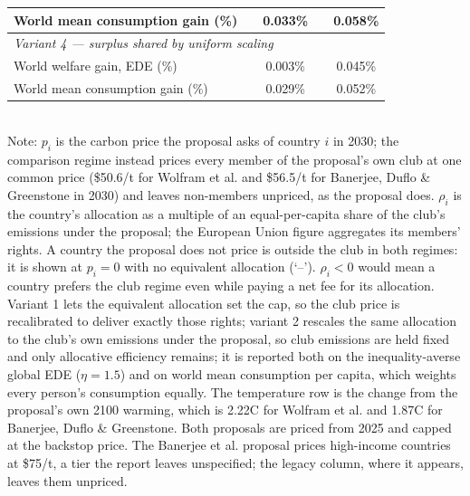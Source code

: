 \begin{table}[htbp]
\begin{tabular}{lcccc}
  \quad World mean consumption gain (\%) &  & 0.033\% &  & 0.058\% \\
  \midrule
  \multicolumn{5}{l}{\textit{Variant 4 --- surplus shared by uniform scaling}} \\
  \quad World welfare gain, EDE (\%) &  & 0.003\% &  & 0.045\% \\
  \quad World mean consumption gain (\%) &  & 0.029\% &  & 0.052\% \\
  \bottomrule
\end{tabular}
\label{tab:equiv_rights_B}
\\[4pt]
{\footnotesize Note: $p_i$ is the carbon price the proposal asks of country $i$ in 2030; the comparison regime instead prices every member of the proposal's own club at one common price (\$50.6/t for Wolfram et al. and \$56.5/t for Banerjee, Duflo \& Greenstone in 2030) and leaves non-members unpriced, as the proposal does. $\rho_i$ is the country's allocation as a multiple of an equal-per-capita share of the club's emissions under the proposal; the European Union figure aggregates its members' rights. A country the proposal does not price is outside the club in both regimes: it is shown at $p_i=0$ with no equivalent allocation (`--'). $\rho_i < 0$ would mean a country prefers the club regime even while paying a net fee for its allocation. Variant 1 lets the equivalent allocation set the cap, so the club price is recalibrated to deliver exactly those rights; variant 2 rescales the same allocation to the club's own emissions under the proposal, so club emissions are held fixed and only allocative efficiency remains; it is reported both on the inequality-averse global EDE ($\eta=1.5$) and on world mean consumption per capita, which weights every person's consumption equally. The temperature row is the change from the proposal's own 2100 warming, which is 2.22\textdegree{}C for Wolfram et al. and 1.87\textdegree{}C for Banerjee, Duflo \& Greenstone. Both proposals are priced from 2025 and capped at the backstop price. The Banerjee et al. proposal prices high-income countries at \$75/t, a tier the report leaves unspecified; the legacy column, where it appears, leaves them unpriced.}
\end{table}
